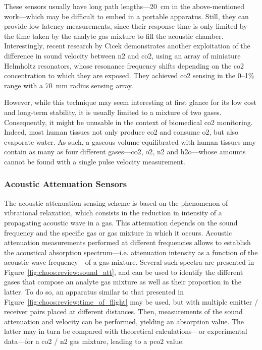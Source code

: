 These sensors usually have long path lengths---20~cm in the above-mentioned work\cite{joos1993}---which may be difficult to embed in a portable apparatus. Still, they can provide low latency measurements, since their response time is only limited by the time taken by the analyte gas mixture to fill the acoustic chamber. Interestingly, recent research by Cicek \etal{}\cite{cicek2019} demonstrates another exploitation of the difference in sound velocity between \gls{n2} and \gls{co2}, using an array of miniature Helmholtz resonators, whose resonance frequency shifts depending on the \gls{co2} concentration to which they are exposed. They achieved \gls{co2} sensing in the 0--1\% range with a 70~mm radius sensing array.

However, while this technique may seem interesting at first glance for its low cost and long-term stability, it is usually limited to a mixture of two gases\cite{gerlach2019_ch9}. Consequently, it might be unusable in the context of biomedical \gls{co2} monitoring. Indeed, most human tissues not only produce \gls{co2} and consume \gls{o2}, but also evaporate water. As such, a gaseous volume equilibrated with human tissues may contain as many as four different gases---\gls{co2}, \gls{o2}, \gls{n2} and \gls{h2o}---whose amounts cannot be found with a single pulse velocity measurement.

\subsubsection{Acoustic Attenuation Sensors}\label{subsect:choos:review:acoust_att}

The acoustic attenuation sensing scheme is based on the phenomenon of vibrational relaxation, which consists in the reduction in intensity of a propagating acoustic wave in a gas. This attenuation depends on the sound frequency and the specific gas or gas mixture in which it occurs\cite{evans1972, bass1990}. Acoustic attenuation measurements performed at different frequencies allows to establish the acoustical absorption spectrum---i.e. attenuation intensity as a function of the acoustic wave frequency---of a gas mixture. Several such spectra are presented in Figure~\ref{fig:choos:review:sound_att}, and can be used to identify the different gases that compose an analyte gas mixture as well as their proportion in the latter. To do so, an apparatus similar to that presented in Figure~\ref{fig:choos:review:time_of_flight} may be used, but with multiple emitter / receiver pairs placed at different distances. Then, measurements of the sound attenuation and velocity can be performed, yielding an absorption value. The latter may in turn be compared with theoretical calculations---or experimental data---for a \gls{co2} / \gls{n2} gas mixture, leading to a \gls{pco2} value.

